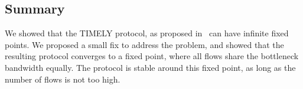 \subsection{Summary}
We showed that the TIMELY protocol, as proposed in~\cite{timely} can have
infinite fixed points. We proposed a small fix
to address the problem, and showed that the resulting protocol converges to a
fixed point, where all flows share the bottleneck bandwidth equally. The
protocol is stable around this fixed point, as long as the number of flows is
not too high.
